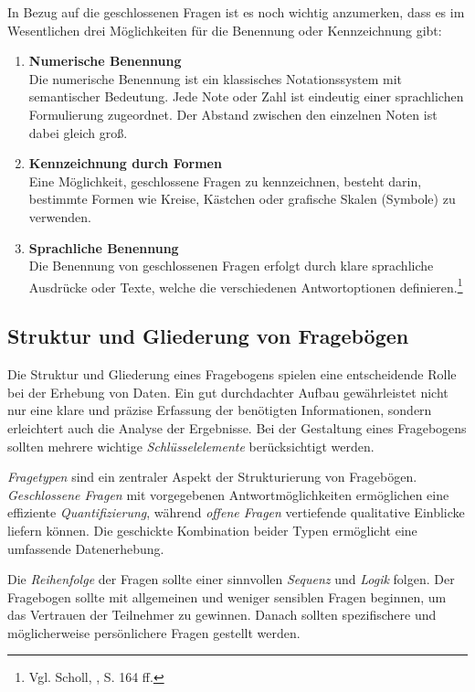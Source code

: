 In Bezug auf die geschlossenen Fragen ist es noch wichtig anzumerken, dass es im Wesentlichen drei Möglichkeiten für die
Benennung oder Kennzeichnung gibt:
\begin{enumerate}
    \item \textbf{Numerische Benennung}\\
    Die numerische Benennung ist ein klassisches Notationssystem mit semantischer Bedeutung. Jede Note oder Zahl ist
    eindeutig einer sprachlichen Formulierung zugeordnet. Der Abstand zwischen den einzelnen Noten ist dabei gleich groß.
    \item \textbf{Kennzeichnung durch Formen}\\
    Eine Möglichkeit, geschlossene Fragen zu kennzeichnen, besteht darin, bestimmte Formen wie Kreise, Kästchen oder
    grafische Skalen (Symbole) zu verwenden.
    \item \textbf{Sprachliche Benennung}\\
    Die Benennung von geschlossenen Fragen erfolgt durch klare sprachliche Ausdrücke oder Texte, welche die verschiedenen
    Antwortoptionen definieren.\footnote{Vgl. Scholl, \cite{Die Befragung}, S. 164 ff.}
\end{enumerate}

\subsection{Struktur und Gliederung von Fragebögen}
Die Struktur und Gliederung eines Fragebogens spielen eine entscheidende Rolle bei der Erhebung von Daten. Ein gut
durchdachter Aufbau gewährleistet nicht nur eine klare und präzise Erfassung der benötigten Informationen, sondern
erleichtert auch die Analyse der Ergebnisse. Bei der Gestaltung eines Fragebogens sollten mehrere wichtige \textit{Schlüsselelemente}
berücksichtigt werden.

\textit{Fragetypen} sind ein zentraler Aspekt der Strukturierung von Fragebögen. \textit{Geschlossene Fragen} mit
vorgegebenen Antwortmöglichkeiten ermöglichen eine effiziente \textit{Quantifizierung}, während \textit{offene Fragen}
vertiefende qualitative Einblicke liefern können. Die geschickte Kombination beider Typen ermöglicht eine umfassende
Datenerhebung.

Die \textit{Reihenfolge} der Fragen sollte einer sinnvollen \textit{Sequenz} und \textit{Logik} folgen. Der Fragebogen
sollte mit allgemeinen und weniger sensiblen Fragen beginnen, um das Vertrauen der Teilnehmer zu gewinnen. Danach sollten
spezifischere und möglicherweise persönlichere Fragen gestellt werden.

